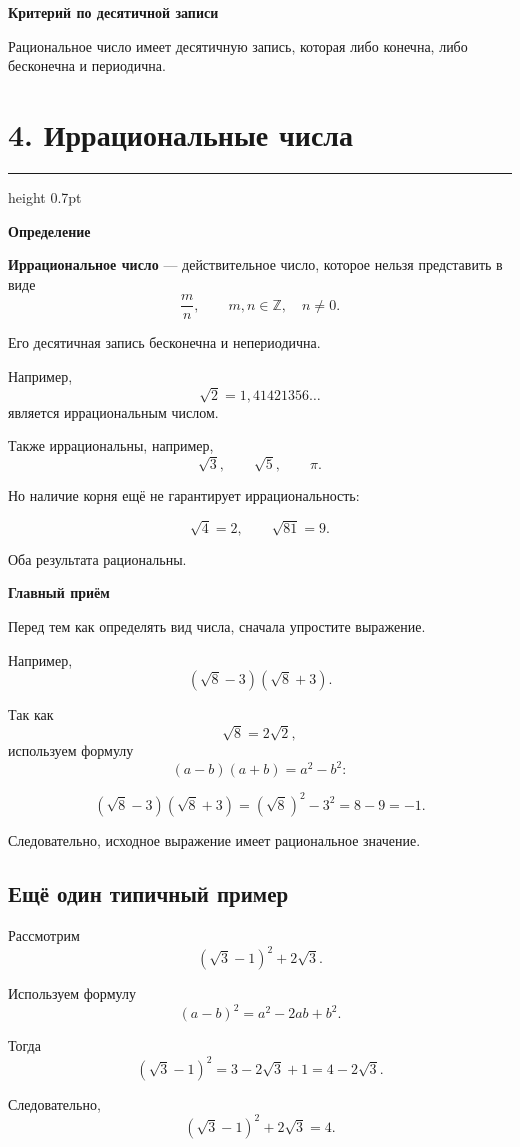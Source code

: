 \documentclass[a4paper,12pt]{article}
\newcommand{\Z}{\mathbb{Z}}
\newcommand{\key}[1]{%
    \par\medskip
    {\color{darkaccent}\bfseries #1}
    \par\smallskip
}
\newcommand{\ruleline}{%
    \par\medskip
    {\color{accent}\hrule height 0.7pt}
    \medskip
}
\begin{document}
\key{Критерий по десятичной записи}

Рациональное число имеет десятичную запись, которая либо конечна,
либо бесконечна и периодична.


\section*{\textcolor{darkaccent}{4. Иррациональные числа}}

\ruleline

\key{Определение}

\textbf{Иррациональное число} --- действительное число, которое нельзя
представить в виде
\[
\frac{m}{n},
\qquad m,n\in\Z,\quad n\ne0.
\]

Его десятичная запись бесконечна и непериодична.

Например,
\[
\sqrt2
=
1{,}41421356\ldots
\]
является иррациональным числом.

Также иррациональны, например,
\[
\sqrt3,\qquad
\sqrt5,\qquad
\pi.
\]

Но наличие корня ещё не гарантирует иррациональность:

\[
\sqrt4=2,
\qquad
\sqrt{81}=9.
\]

Оба результата рациональны.

\key{Главный приём}

Перед тем как определять вид числа, сначала упростите выражение.

Например,
\[
(\sqrt8-3)(\sqrt8+3).
\]

Так как
\[
\sqrt8=2\sqrt2,
\]
используем формулу
\[
(a-b)(a+b)=a^2-b^2:
\]

\[
(\sqrt8-3)(\sqrt8+3)
=
(\sqrt8)^2-3^2
=
8-9=-1.
\]

Следовательно, исходное выражение имеет рациональное значение.


\subsection*{\textcolor{darkaccent}{Ещё один типичный пример}}

Рассмотрим
\[
(\sqrt3-1)^2+2\sqrt3.
\]

Используем формулу
\[
(a-b)^2=a^2-2ab+b^2.
\]

Тогда
\[
(\sqrt3-1)^2
=
3-2\sqrt3+1
=
4-2\sqrt3.
\]

Следовательно,
\[
(\sqrt3-1)^2+2\sqrt3
=
4.
\]
\end{document}
